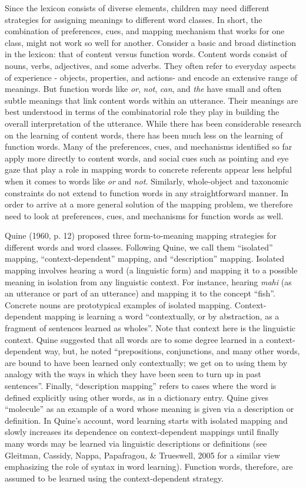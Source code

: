 \documentclass[
  ,man,floatsintext]{apa6}
\begin{document}
Since the lexicon consists of diverse elements, children may need different strategies for assigning meanings to different word classes. In short, the combination of preferences, cues, and mapping mechanism that works for one class, might not work so well for another. Consider a basic and broad distinction in the lexicon: that of content versus function words. Content words consist of nouns, verbs, adjectives, and some adverbs. They often refer to everyday aspects of experience - objects, properties, and actions- and encode an extensive range of meanings. But function words like \emph{or}, \emph{not}, \emph{can}, and \emph{the} have small and often subtle meanings that link content words within an utterance. Their meanings are best understood in terms of the combinatorial role they play in building the overall interpretation of the utterance. While there has been considerable research on the learning of content words, there has been much less on the learning of function words. Many of the preferences, cues, and mechanisms identified so far apply more directly to content words, and social cues such as pointing and eye gaze that play a role in mapping words to concrete referents appear less helpful when it comes to words like \emph{or} and \emph{not}. Similarly, whole-object and taxonomic constraints do not extend to function words in any straightforward manner. In order to arrive at a more general solution of the mapping problem, we therefore need to look at preferences, cues, and mechanisms for function words as well.

Quine (1960, p. 12) proposed three form-to-meaning mapping strategies for different words and word classes. Following Quine, we call them ``isolated'' mapping, ``context-dependent'' mapping, and ``description'' mapping. Isolated mapping involves hearing a word (a linguistic form) and mapping it to a possible meaning in isolation from any linguistic context. For instance, hearing \emph{mahi} (as an utterance or part of an utterance) and mapping it to the concept ``fish''. Concrete nouns are prototypical examples of isolated mapping. Context-dependent mapping is learning a word ``contextually, or by abstraction, as a fragment of sentences learned as wholes''. Note that context here is the linguistic context. Quine suggested that all words are to some degree learned in a context-dependent way, but, he noted ``prepositions, conjunctions, and many other words, are bound to have been learned only contextually; we get on to using them by analogy with the ways in which they have been seen to turn up in past sentences''. Finally, ``description mapping'' refers to cases where the word is defined explicitly using other words, as in a dictionary entry. Quine gives ``molecule'' as an example of a word whose meaning is given via a description or definition. In Quine's account, word learning starts with isolated mapping and slowly increases its dependence on context-dependent mappings until finally many words may be learned via linguistic descriptions or definitions (see Gleitman, Cassidy, Nappa, Papafragou, \& Trueswell, 2005 for a similar view emphasizing the role of syntax in word learning). Function words, therefore, are assumed to be learned using the context-dependent strategy.
\end{document}
